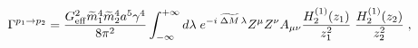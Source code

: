 \begin{equation} 
\Gamma^{p_1 \to p_2}
= 
\frac{G_{\rm eff}^2 \widetilde{m}_1^4 \widetilde{m}_2^4 a^5\gamma^4}{8 \pi^2 }
\int_{- \infty}^{+\infty} d \lambda  \;
e^{- i\; \widetilde{\Delta M}\, \lambda } 
Z^\mu Z^\nu A_{\mu \nu} 
\frac{ H_2^{(1)} ( z_1 ) }{z_1^2}\; 
\frac{ H_2^{(1)} ( z_2 ) }{z_2^2}  \; ,
\label{Gfim}
\end{equation}

